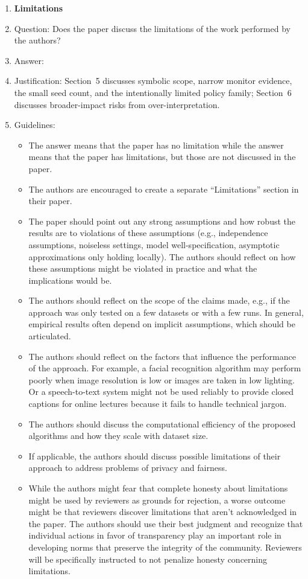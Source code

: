 \documentclass{article}
\begin{document}
\begin{enumerate}
\item {\bf Limitations}
    \item[] Question: Does the paper discuss the limitations of the work performed by the authors?
    \item[] Answer: \answerYes{}
    \item[] Justification: Section~5 discusses symbolic scope, narrow monitor evidence, the small seed count, and the intentionally limited policy family; Section~6 discusses broader-impact risks from over-interpretation.
    \item[] Guidelines:
    \begin{itemize}
        \item The answer \answerNA{} means that the paper has no limitation while the answer \answerNo{} means that the paper has limitations, but those are not discussed in the paper.
        \item The authors are encouraged to create a separate ``Limitations'' section in their paper.
        \item The paper should point out any strong assumptions and how robust the results are to violations of these assumptions (e.g., independence assumptions, noiseless settings, model well-specification, asymptotic approximations only holding locally). The authors should reflect on how these assumptions might be violated in practice and what the implications would be.
        \item The authors should reflect on the scope of the claims made, e.g., if the approach was only tested on a few datasets or with a few runs. In general, empirical results often depend on implicit assumptions, which should be articulated.
        \item The authors should reflect on the factors that influence the performance of the approach. For example, a facial recognition algorithm may perform poorly when image resolution is low or images are taken in low lighting. Or a speech-to-text system might not be used reliably to provide closed captions for online lectures because it fails to handle technical jargon.
        \item The authors should discuss the computational efficiency of the proposed algorithms and how they scale with dataset size.
        \item If applicable, the authors should discuss possible limitations of their approach to address problems of privacy and fairness.
        \item While the authors might fear that complete honesty about limitations might be used by reviewers as grounds for rejection, a worse outcome might be that reviewers discover limitations that aren't acknowledged in the paper. The authors should use their best judgment and recognize that individual actions in favor of transparency play an important role in developing norms that preserve the integrity of the community. Reviewers will be specifically instructed to not penalize honesty concerning limitations.
    \end{itemize}


\end{enumerate}
\end{document}
